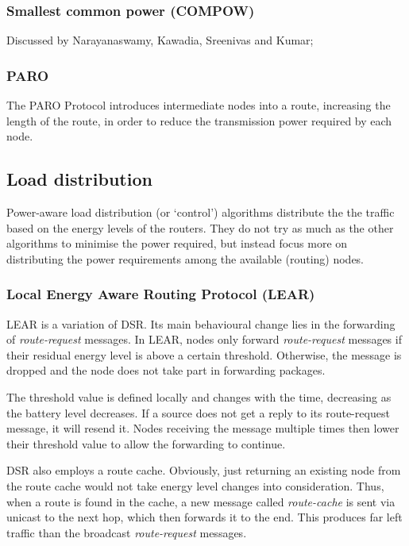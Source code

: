 \documentclass[conference]{IEEEtran}
\begin{document}
\subsubsection{Smallest common power (COMPOW)}
Discussed by Narayanaswamy, Kawadia, Sreenivas and Kumar\cite{narayanaswamy2002power};

\subsubsection{PARO}
The PARO Protocol\cite{gomez2003paro} introduces intermediate nodes into a
route, increasing the length of the route, in order to reduce the transmission
power required by each node.

\subsection{Load distribution}
Power-aware load distribution (or `control') algorithms distribute the the
traffic based on the energy levels of the routers.
They do not try as much as the other algorithms to minimise the power required,
but instead focus more on distributing the power requirements among the available (routing) nodes.

\subsubsection{Local Energy Aware Routing Protocol (LEAR)}
LEAR\cite{woo2001non} is a variation of DSR.
Its main behavioural change lies in the forwarding of \textit{route-request} messages.
In LEAR, nodes only forward \textit{route-request} messages if their residual
energy level is above a certain threshold. Otherwise, the message is dropped
and the node does not take part in forwarding packages.

The threshold value is defined locally and changes with the time, decreasing
as the battery level decreases. If a source does not get a reply to its
route-request message, it will resend it. Nodes receiving the message multiple
times then lower their threshold value to allow the forwarding to continue.

DSR also employs a route cache. Obviously, just returning an existing node
from the route cache would not take energy level changes into consideration.
Thus, when a route is found in the cache, a new message called \textit{route-cache}
is sent via unicast to the next hop, which then forwards it to the end. This
produces far left traffic than the broadcast \textit{route-request} messages.
\end{document}
